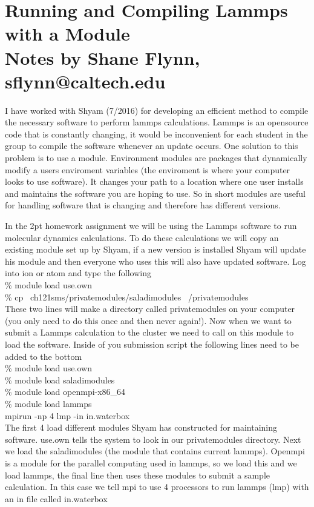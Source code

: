 \documentclass{article}
\begin{document}
\section*{Running and Compiling Lammps with a Module \\ Notes by Shane Flynn, sflynn@caltech.edu}
I have worked with Shyam (7/2016) for developing an efficient method to compile the necessary software to perform lammps calculations. 
Lammps is an opensource code that is constantly changing, it would be inconvenient for each student in the group to compile the software whenever an update occurs. 
One solution to this problem is to use a module.
Environment modules are packages that dynamically modify a users enviroment variables (the enviroment is where your computer looks to use software). 
It changes your path to a location where one user installs and maintains the software you are hoping to use. 
So in short modules are useful for handling software that is changing and therefore has different versions. 

In the 2pt homework assignment we will be using the Lammps software to run molecular dynamics calculations.
To do these calculations we will copy an existing module set up by Shyam, if a new version is installed Shyam will update his module and then everyone who uses this will also have updated software.
Log into ion or atom and type the following \\

\% module load use.own \\
\% cp ~ch121sms/privatemodules/saladimodules ~/privatemodules \\

These two lines will make a directory called privatemodules on your computer (you only need to do this once and then never again!). 
Now when we want to submit a Lammps calculation to the cluster we need to call on this module to load the software. 
Inside of you submission script the following lines need to be added to the bottom\\
\% module load use.own \\
\% module load saladimodules \\
\% module load openmpi-x86\_64 \\
\% module load lammps \\

mpirun -np 4 lmp -in in.waterbox\\

The first 4 load different modules Shyam has constructed for maintaining software. 
use.own tells the system to look in our privatemodules directory.
Next we load the saladimodules (the module that contains current lammps).
Openmpi is a module for the parallel computing used in lammps, so we load this and we load lammps, the final line then uses these modules to submit a sample calculation.
In this case we tell mpi to use 4 processors to run lammps (lmp) with an in file called in.waterbox
\end{document}

